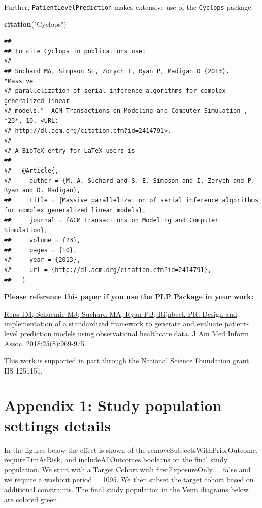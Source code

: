 \documentclass[
]{article}
\newenvironment{Shaded}{\begin{snugshade}}{\end{snugshade}}
\newcommand{\KeywordTok}[1]{\textcolor[rgb]{0.13,0.29,0.53}{\textbf{#1}}}
\newcommand{\NormalTok}[1]{#1}
\newcommand{\StringTok}[1]{\textcolor[rgb]{0.31,0.60,0.02}{#1}}
\begin{document}
Further, \texttt{PatientLevelPrediction} makes extensive use of the
\texttt{Cyclops} package.

\begin{Shaded}
\begin{Highlighting}[]
\KeywordTok{citation}\NormalTok{(}\StringTok{"Cyclops"}\NormalTok{)}
\end{Highlighting}
\end{Shaded}

\begin{verbatim}
## 
## To cite Cyclops in publications use:
## 
## Suchard MA, Simpson SE, Zorych I, Ryan P, Madigan D (2013). "Massive
## parallelization of serial inference algorithms for complex generalized linear
## models." _ACM Transactions on Modeling and Computer Simulation_, *23*, 10. <URL:
## http://dl.acm.org/citation.cfm?id=2414791>.
## 
## A BibTeX entry for LaTeX users is
## 
##   @Article{,
##     author = {M. A. Suchard and S. E. Simpson and I. Zorych and P. Ryan and D. Madigan},
##     title = {Massive parallelization of serial inference algorithms for complex generalized linear models},
##     journal = {ACM Transactions on Modeling and Computer Simulation},
##     volume = {23},
##     pages = {10},
##     year = {2013},
##     url = {http://dl.acm.org/citation.cfm?id=2414791},
##   }
\end{verbatim}

\textbf{Please reference this paper if you use the PLP Package in your
work:}

\href{http://dx.doi.org/10.1093/jamia/ocy032}{Reps JM, Schuemie MJ,
Suchard MA, Ryan PB, Rijnbeek PR. Design and implementation of a
standardized framework to generate and evaluate patient-level prediction
models using observational healthcare data. J Am Med Inform Assoc.
2018;25(8):969-975.}

This work is supported in part through the National Science Foundation
grant IIS 1251151.

\newpage

\hypertarget{appendix-1-study-population-settings-details}{%
\section*{Appendix 1: Study population settings
details}\label{appendix-1-study-population-settings-details}}

In the figures below the effect is shown of the
removeSubjectsWithPriorOutcome, requireTimAtRisk, and includeAllOutcomes
booleans on the final study population. We start with a Target Cohort
with firstExposureOnly = false and we require a washout period = 1095.
We then subset the target cohort based on additional constraints. The
final study population in the Venn diagrams below are colored green.
\end{document}
